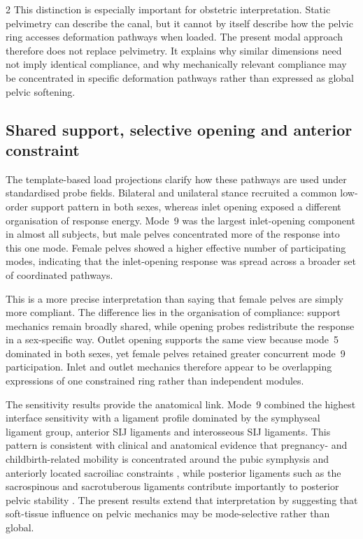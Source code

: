 \documentclass[openacc]{rsproca_new}
\begin{document}
\begin{multicols}{2}
This distinction is especially important for obstetric interpretation. Static pelvimetry can describe the canal, but it cannot by itself describe how the pelvic ring accesses deformation pathways when loaded. The present modal approach therefore does not replace pelvimetry. It explains why similar dimensions need not imply identical compliance, and why mechanically relevant compliance may be concentrated in specific deformation pathways rather than expressed as global pelvic softening.

\subsection{Shared support, selective opening and anterior constraint}

The template-based load projections clarify how these pathways are used under standardised probe fields. Bilateral and unilateral stance recruited a common low-order support pattern in both sexes, whereas inlet opening exposed a different organisation of response energy. Mode~9 was the largest inlet-opening component in almost all subjects, but male pelves concentrated more of the response into this one mode. Female pelves showed a higher effective number of participating modes, indicating that the inlet-opening response was spread across a broader set of coordinated pathways.

This is a more precise interpretation than saying that female pelves are simply more compliant. The difference lies in the organisation of compliance: support mechanics remain broadly shared, while opening probes redistribute the response in a sex-specific way. Outlet opening supports the same view because mode~5 dominated in both sexes, yet female pelves retained greater concurrent mode~9 participation. Inlet and outlet mechanics therefore appear to be overlapping expressions of one constrained ring rather than independent modules.

The sensitivity results provide the anatomical link. Mode~9 combined the highest interface sensitivity with a ligament profile dominated by the symphyseal ligament group, anterior SIJ ligaments and interosseous SIJ ligaments. This pattern is consistent with clinical and anatomical evidence that pregnancy- and childbirth-related mobility is concentrated around the pubic symphysis and anteriorly located sacroiliac constraints \cite{Damen2001,Pires2015,Cicek2015,Fiani2021}, while posterior ligaments such as the sacrospinous and sacrotuberous ligaments contribute importantly to posterior pelvic stability \cite{Hammer2019,Aldabe2019}. The present results extend that interpretation by suggesting that soft-tissue influence on pelvic mechanics may be mode-selective rather than global.


\end{multicols}
\end{document}
